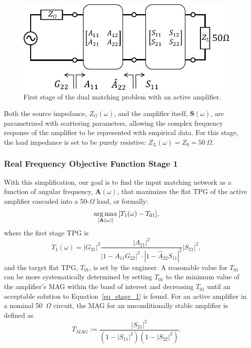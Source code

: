 \begin{figure}[h]
\centering
  \includegraphics[width=0.67\linewidth]{figs/matching/matching_stage_1}   
    \caption{First stage of the dual matching problem with an active amplifier.}
\label{fig_matching_stage_1}
\end{figure}

	Both the source impedance, $Z_G(\omega)$, and the amplifier itself, $\mathbf{S}(\omega)$, are parametrized with scattering parameters, allowing the complex frequency response of the amplifier to be represented with empirical data.
	For this stage, the load impedance is set to be purely resistive: $Z_L(\omega) = Z_0 = 50~\Omega$.

\subsubsection{Real Frequency Objective Function Stage 1}
\label{sec_srft_stage_1}

	With this simplification, our goal is to find the input matching network as a function of angular frequency, $\textbf{A}(\omega)$, that maximizes the flat \ac{TPG} of the active amplifier cascaded into a 50-$\Omega$ load, or formally:
	\begin{equation} \label{eq_stage_1}
		\argmax_{[\textbf{A}(\omega)]}{[T_1(\omega) - T_{01}]},
	\end{equation}
where the first stage \ac{TPG} is
	\begin{equation} \label{eq_stage_1_tpg}
		{T_1(\omega)} = |G_{21}|^2\frac{|A_{21}|^2}{|1-A_{11}G_{22}|^2\cdot|1-\hat{A}_{22}S_{11}|^2}|S_{21}|^2,
	\end{equation}
and the target flat \ac{TPG}, $T_{01}$, is set by the engineer.
	A reasonable value for $T_{01}$ can be more systematically determined by setting $T_{01}$ to the minimum value of the amplifier's \ac{MAG} within the band of interest and decreasing $T_{01}$ until an acceptable solution to Equation~\ref{eq_stage_1} is found.
	For an active amplifier in a nominal 50~$\Omega$ circuit, the \ac{MAG} for an unconditionally stable \cite{orfanidis2002electromagnetic} amplifier is defined as 
\begin{equation} \label{eq_mag}
T_{MAG} := \frac{|S_{21}|^2}{(1-|S_{11}|^2)(1-|S_{22}|^2)}.
\end{equation}

